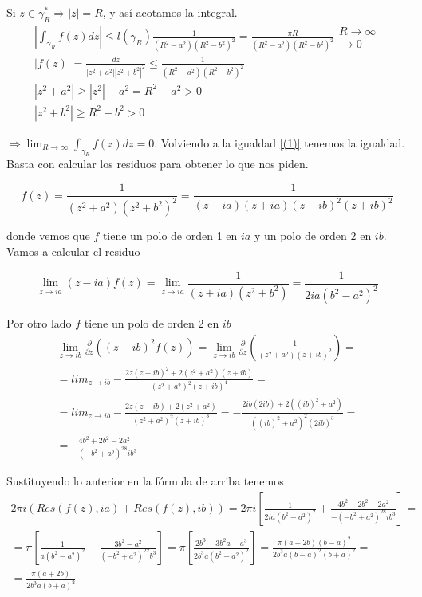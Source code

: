 \documentclass{article}
\begin{document}
Si $z\in \gamma_R^*\Rightarrow |z|=R$, y así acotamos la integral.
\begin{gather*}
|\int_{\gamma_R}f(z)dz|\leq l(\gamma_R)\frac{1}{(R^2-a^2)(R^2-b^2)^2}=\frac{\pi R}{(R^2-a^2)(R^2-b^2)^2}\left.\begin{array}{c}
R\to \infty\\
\longrightarrow 0
\end{array}\right.\\
|f(z)|=\frac{dz}{|z^2+a^2||z^2+b^2|^2}\leq \frac{1}{(R^2-a^2)(R^2-b^2)^2}\\
|z^2+a^2|\geq |z^2|-a^2=R^2-a^2>0\\
|z^2+b^2|\geq R^2-b^2>0
\end{gather*}

$\Rightarrow  \lim_{R\to\infty}\int_{\gamma_R}f(z)dz=0$. Volviendo a la igualdad \ref{(1)} tenemos la igualdad. Basta con calcular los residuos para obtener lo que nos piden.

\begin{equation*}
f(z)=\frac{1}{(z^2+a^2)(z^2+b^2)^2}=\frac{1}{(z-ia)(z+ia)(z-ib)^2(z+ib)^2}
\end{equation*}

donde vemos que $f$ tiene un polo de orden 1 en $ia$ y un polo de orden 2 en $ib$. Vamos a calcular el residuo

\begin{equation*}
\lim_{z\to ia}(z-ia)f(z)=\lim_{z\to ia}\frac{1}{(z+ia)(z^2+b^2)}=\frac{1}{2ia(b^2-a^2)^2}
\end{equation*}

Por otro lado $f$ tiene un polo de orden 2 en $ib$
\begin{gather*}
\lim_{z\to ib}\frac{\partial }{\partial z}((z-ib)^2f(z))=\lim_{z\to ib}\frac{\partial }{\partial z}(\frac{1}{(z^2+a^2)(z+ib)^2})=\\
=lim_{z\to ib}-\frac{2z(z+ib)^2+2(z^2+a^2)(z+ib)}{(z^2+a^2)^2(z+ib)^4}=\\
=lim_{z\to ib}-\frac{2z(z+ib)+2(z^2+a^2)}{(z^2+a^2)^2(z+ib)^3}=-\frac{2ib(2ib)+
2((ib)^2+a^2)}{((ib)^2+a^2)^2(2ib)^3}=\\
=\frac{4b^2+2b^2-2a^2}{-(-b^2+a^2)^28ib^3}
\end{gather*}

Sustituyendo lo anterior en la fórmula de arriba tenemos
\begin{gather*}
2\pi i(Res(f(z),ia)+Res(f(z),ib))=2\pi i\left[\frac{1}{2ia(b^2-a^2)^2}+\frac{4b^2+2b^2-2a^2}{-(-b^2+a^2)^28ib^3}\right]=\\
=\pi\left[\frac{1}{a(b^2-a^2)^2}-\frac{3b^2-a^2}{(-b^2+a^2)^22b^3}\right]=\pi\left[\frac{2b^3-3b^2a+a^3}{2b^3a(b^2-a^2)^2}\right]=\frac{\pi(a+2b)(b-a)^2}{2b^3a(b-a)^2(b+a)^2}=\\
=\frac{\pi(a+2b)}{2b^3a(b+a)^2}
\end{gather*}
\end{document}

